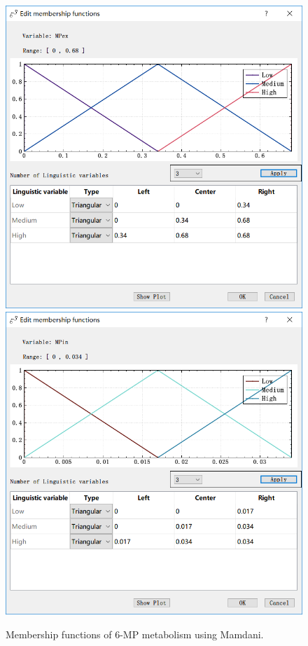 \documentclass[journal,a4paper,onecolumn]{article}
\begin{document}
\begin{figure}[!hbt]
	\begin{center}
		\includegraphics[width=0.45\columnwidth]{fig57}
		\includegraphics[width=0.45\columnwidth]{fig58}
		\caption{Membership functions of 6-MP metabolism using Mamdani.}
		\label{fig:Membership functions of 6-MP metabolism using Mamdani.}
	\end{center}
\end{figure}
\end{document}

